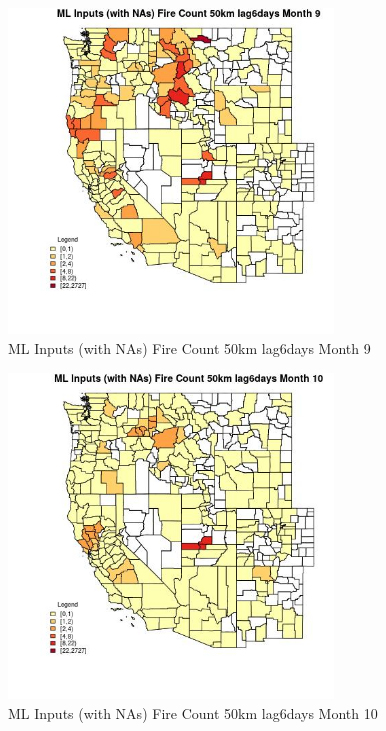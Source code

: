 \begin{figure} 
\centering  
\includegraphics[width=0.77\textwidth]{Code_Outputs/Report_ML_input_PM25_Step4_part_f_de_duplicated_aves_prioritize_24hr_obswNAs_CountyFire_Count_50km_lag6daysmedianMonth9.jpg} 
\caption{\label{fig:Report_ML_input_PM25_Step4_part_f_de_duplicated_aves_prioritize_24hr_obswNAsCountyFire_Count_50km_lag6daysmedianMonth9}ML Inputs (with NAs) Fire Count 50km lag6days Month 9} 
\end{figure} 
 

\begin{figure} 
\centering  
\includegraphics[width=0.77\textwidth]{Code_Outputs/Report_ML_input_PM25_Step4_part_f_de_duplicated_aves_prioritize_24hr_obswNAs_CountyFire_Count_50km_lag6daysmedianMonth10.jpg} 
\caption{\label{fig:Report_ML_input_PM25_Step4_part_f_de_duplicated_aves_prioritize_24hr_obswNAsCountyFire_Count_50km_lag6daysmedianMonth10}ML Inputs (with NAs) Fire Count 50km lag6days Month 10} 
\end{figure} 
 

